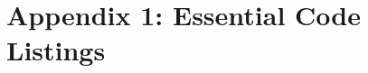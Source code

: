 \documentclass[onecolumn, draftclsnofoot,10pt, compsoc]{IEEEtran}
\begin{document}
\section{Appendix 1: Essential Code Listings}









	
	
\end{document}
